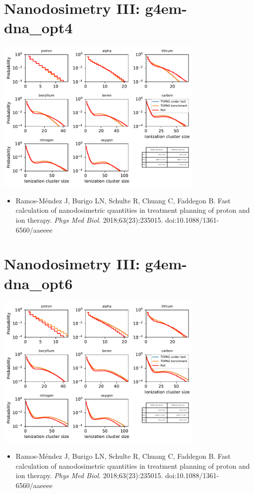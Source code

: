 \documentclass[aspectratio=1610]{beamer}
\begin{document}
\section{Nanodosimetry III: g4em-dna\_opt4}

\begin{frame}{\secname}
 \centering
   \includegraphics[width=0.75\textwidth]{./NanodosimetryIII/nanoIII_opt4}
\begin{itemize}
 \item \tiny{Ramos-M\'endez J, Burigo LN, Schulte R, Chuang C, Faddegon B. Fast calculation of nanodosimetric quantities in treatment planning of proton and ion therapy. \textit{Phys Med Biol.} 2018;63(23):235015. doi:10.1088/1361-6560/aaeeee}
\end{itemize}
\end{frame}

\section{Nanodosimetry III: g4em-dna\_opt6}

\begin{frame}{\secname}
 \centering
   \includegraphics[width=0.75\textwidth]{./NanodosimetryIII/nanoIII_opt6}
\begin{itemize}
 \item \tiny{Ramos-M\'endez J, Burigo LN, Schulte R, Chuang C, Faddegon B. Fast calculation of nanodosimetric quantities in treatment planning of proton and ion therapy. \textit{Phys Med Biol.} 2018;63(23):235015. doi:10.1088/1361-6560/aaeeee}
\end{itemize}
\end{frame}
\end{document}
